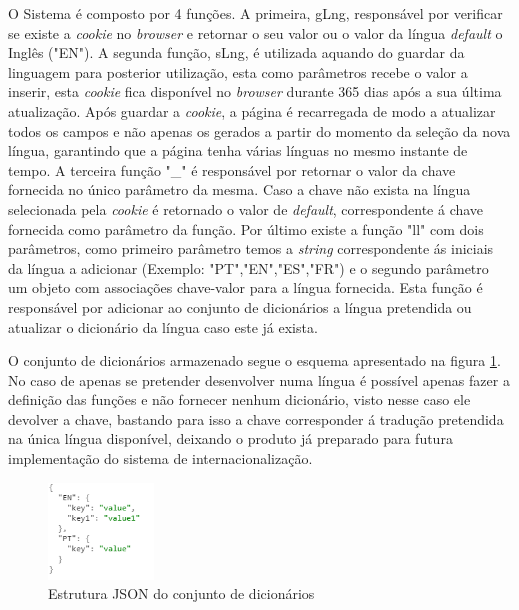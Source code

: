 \par O Sistema é composto por 4 funções. A primeira, gLng, responsável por verificar se existe a \textit{cookie} no \textit{browser} e retornar o seu valor ou o valor da língua \textit{default} o Inglês ("EN"). A segunda função, sLng, é utilizada aquando do guardar da linguagem para posterior utilização, esta como parâmetros recebe o valor a inserir, esta \textit{cookie} fica disponível no \textit{browser} durante 365 dias após a sua última atualização. Após guardar a \textit{cookie}, a página é recarregada de modo a atualizar todos os campos e não apenas os gerados a partir do momento da seleção da nova língua, garantindo que a página tenha várias línguas no mesmo instante de tempo. A terceira função "\_" é responsável por retornar o valor da chave fornecida no único parâmetro da mesma. Caso a chave não exista na língua selecionada pela \textit{cookie} é retornado o valor de \textit{default}, correspondente á chave fornecida como parâmetro da função. Por último existe a função "ll" com dois parâmetros, como primeiro parâmetro temos a \textit{string} correspondente ás iniciais da língua a adicionar (Exemplo: "PT","EN","ES","FR") e o segundo parâmetro um objeto com associações chave-valor para a língua fornecida. Esta função é responsável por adicionar ao conjunto de dicionários a língua pretendida ou atualizar o dicionário da língua caso este já exista.
\par O conjunto de dicionários armazenado segue o esquema apresentado na figura \ref{dicextr}. No caso de apenas se pretender desenvolver numa língua é possível apenas fazer a definição das funções e não fornecer nenhum dicionário, visto nesse caso ele devolver a chave, bastando para isso a chave corresponder á tradução pretendida na única língua disponível, deixando o produto já preparado para futura implementação do sistema de internacionalização.



\begin{figure}[ht]
\centering
\includegraphics[width=0.25\textwidth]{images/extrjson.png}
\caption{Estrutura JSON do conjunto de dicionários}\label{dicextr}
\end{figure}

